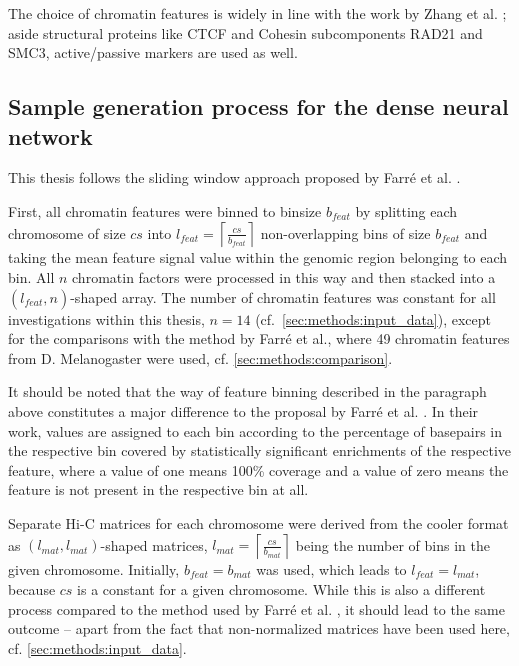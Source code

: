 The choice of chromatin features is widely in line with the work by Zhang et al. \cite{Zhang2019}; 
aside structural proteins like CTCF and Cohesin subcomponents RAD21 and SMC3, active/passive markers are used as well.

\subsection{Sample generation process for the dense neural network} \label{sec:methods:sample_gen}
This thesis follows the sliding window approach proposed by Farr\'e et al. \cite{Farre2018a}.

First, all chromatin features were binned to binsize $b_\mathit{feat}$ by splitting each chromosome of size $cs$ into 
$l_\mathit{feat}=\left \lceil{\frac{cs}{b_\mathit{feat}}}\right \rceil$ non-overlapping bins of size $b_\mathit{feat}$
and taking the mean feature signal value within the genomic region belonging to each bin.
All $n$ chromatin factors were processed in this way and then stacked into a $(l_\mathit{feat},n)$-shaped array.
The number of chromatin features was constant for all investigations within this thesis, $n=14$ (cf.~\cref{sec:methods:input_data}),
except for the comparisons with the method by Farr\'e et al., where 49 chromatin features from D. Melanogaster were used, cf. \cref{sec:methods:comparison}.

It should be noted that the way of feature binning described in the paragraph above constitutes a major difference to the proposal by Farr\'e et al. \cite[p.~9]{Farre2018a}.
In their work, values are assigned to each bin according to the percentage of basepairs in the respective bin covered by statistically significant enrichments of the respective feature,
where a value of one means 100\% coverage and a value of zero means the feature is not present in the respective bin at all.

Separate Hi-C matrices for each chromosome were derived from the cooler format as $(l_\mathit{mat}, l_\mathit{mat})$-shaped matrices, 
$l_\mathit{mat}=\left \lceil{\frac{cs}{b_\mathit{mat}}}\right \rceil$ being the number of bins in the given chromosome. 
Initially, $b_\mathit{feat} = b_\mathit{mat}$ was used, which leads to $l_\mathit{feat} = l_\mathit{mat}$, because $cs$ is a constant for a given chromosome.
While this is also a different process compared to the method used by Farr\'e et al. \cite[p.~8f]{Farre2018a}, it should lead to the same outcome --
apart from the fact that non-normalized matrices have been used here, cf. \cref{sec:methods:input_data}.

